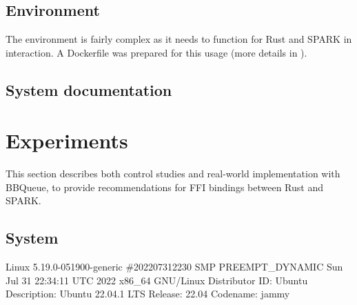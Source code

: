 \documentclass[nomenclature, english, bibtex]{kththesis}
\newcommand*{\generalExpl}[1]{\todo[inline]{#1}}
\newcommand*{\sweExpl}[1]{\todo[inline, backgroundcolor=kth-lightblue40]{#1}}  %
\begin{document}
\section{Environment}

The environment is fairly complex as it needs to function for Rust and SPARK in interaction. A  Dockerfile was prepared for this usage (more details in ).


\section{System documentation}
\label{sec:systemDocumentation}




\cleardoublepage
\chapter{Experiments}
\label{ch:whatYouDid}

  



This section describes both control studies and real-world implementation with BBQueue, to provide recommendations for FFI bindings between Rust and SPARK. 





\section{System}
Linux 5.19.0-051900-generic \#202207312230 SMP PREEMPT\_DYNAMIC Sun Jul 31 22:34:11 UTC 2022 x86\_64 GNU/Linux
Distributor ID:	Ubuntu
Description:	Ubuntu 22.04.1 LTS
Release:	22.04
Codename:	jammy
\end{document}
